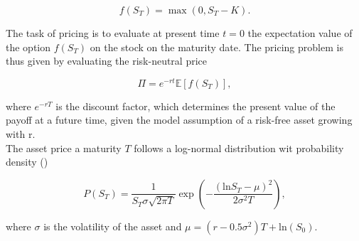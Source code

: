 \documentclass[../main.tex]{subfiles}
\begin{document}
\begin{equation}
    f(S_T) = \max(0, S_T - K ).
\end{equation}

The task of pricing is to evaluate at present time $t = 0$ the expectation value of the option $f(S_T)$ on the stock on the maturity date.
The pricing problem is thus given by evaluating the risk-neutral price

\begin{equation}
    \Pi = e^{-rt} \mathbb{E}[f(S_T)],
\end{equation}

where $e^{-rT}$ is the discount factor, which determines the present value of the payoff at a future time, given the model assumption of a risk-free asset growing with r.\\
The asset price a maturity $T$ follows a log-normal distribution wit probability density (\cite{Stamatopoulos_2019})

\begin{equation}\label{eq:lognormal}
    P(S_T) = \frac{1}{S_T \sigma \sqrt{2 \pi T}} \exp{(- \frac{(\text{ln} S_T - \mu)^2}{2 \sigma^2 T})},
\end{equation}

where $\sigma$ is the volatility of the asset and $\mu = (r-0.5\sigma^2)T + \text{ln}(S_0)$.

\biblio
\end{document}
